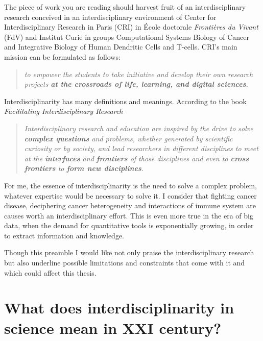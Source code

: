 \documentclass[12pt,]{book}
\theoremstyle{definition}
\theoremstyle{definition}
\theoremstyle{definition}
\theoremstyle{remark}
\begin{document}
The piece of work you are reading should harvest fruit of an
interdisciplinary research conceived in an interdisciplinary environment
of Center for Interdisciplinary Research in Paris (CRI) in École
doctorale \emph{Frontières du Vivant} (FdV) and Institut Curie in groups
Computational Systems Biology of Cancer and Integrative Biology of Human
Dendritic Cells and T-cells. CRI's main mission can be formulated as
follows:

\begin{quote}
\emph{to empower the students to take initiative and develop their own
research projects \textbf{at the crossroads of life, learning, and
digital sciences}.} \citep{CRIweb}
\end{quote}

Interdisciplinarity has many definitions and meanings. According to the
book \emph{Facilitating Interdisciplinary Research} \citep{FIRbook}

\begin{quote}
\emph{Interdisciplinary research and education are inspired by the drive
to solve \textbf{complex questions} and problems, whether generated by
scientific curiosity or by society, and lead researchers in different
disciplines to meet at the \textbf{interfaces} and \textbf{frontiers} of
those disciplines and even to \textbf{cross frontiers} to \textbf{form
new disciplines}.}
\end{quote}

For me, the essence of interdisciplinarity is the need to solve a
complex problem, whatever expertise would be necessary to solve it. I
consider that fighting cancer disease, deciphering cancer heterogeneity
and interactions of immune system are causes worth an interdisciplinary
effort. This is even more true in the era of big data, when the demand
for quantitative tools is exponentially growing, in order to extract
information and knowledge.

Though this preamble I would like not only praise the interdisciplinary
research but also underline possible limitations and constraints that
come with it and which could affect this thesis.

\hypertarget{what-does-interdisciplinarity-in-science-mean-in-xxi-century}{%
\section*{What does interdisciplinarity in science mean in XXI
century?}\label{what-does-interdisciplinarity-in-science-mean-in-xxi-century}}
\end{document}
